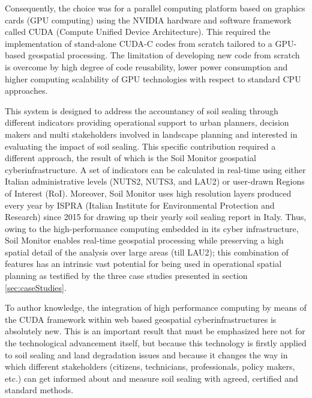 \documentclass[APA,LATO1COL,doublespace]{WileyNJD-v2}
\newcommand{\update}[1]{\emph{\textcolor{blue}{#1}}}     %
\begin{document}
Consequently, the choice was for a parallel computing platform based on graphics cards (GPU computing) using the NVIDIA hardware and software framework called CUDA (Compute Unified Device Architecture).
This required the implementation of stand-alone CUDA-C codes from scratch tailored to a GPU-based geospatial processing.
The limitation of developing new code from scratch is overcome by high degree of code reusability, lower power consumption and higher computing scalability of GPU technologies with respect to standard CPU approaches.

This system is designed to address the accountancy of soil sealing through different indicators providing operational support to urban planners, decision makers and multi stakeholders involved in landscape planning and interested in evaluating the impact of soil sealing. 
This specific contribution required a different approach, the result of which is the Soil Monitor geospatial cyberinfrastructure. 
A set of indicators can be calculated in real-time using either Italian administrative levels (NUTS2, NUTS3, and LAU2) or user-drawn Regions of Interest (RoI). 
Moreover, Soil Monitor uses high resolution layers produced every year by ISPRA (Italian Institute for Environmental Protection and Research) since 2015 for drawing up their yearly soil sealing report in Italy. 
Thus, owing to the high-performance computing embedded in its cyber infrastructure, Soil Monitor enables real-time geospatial processing while preserving a high spatial detail of the analysis over large areas (till LAU2); this combination of features has an intrinsic vast potential for being used in operational spatial planning as testified by the three case studies presented in section \ref{sec:caseStudies}. 

To author knowledge, the
integration of high performance computing by means of the CUDA framework within web based geospatial cyberinfrastructures is absolutely new.
This is an important result that must be emphasized here not for the technological advancement itself, but because this technology is firstly applied to soil sealing and land degradation issues and because it changes the way in which different stakeholders (citizens, technicians, professionals, policy makers, etc.) can get informed about and measure soil sealing with agreed, certified and standard methods.
\end{document}
